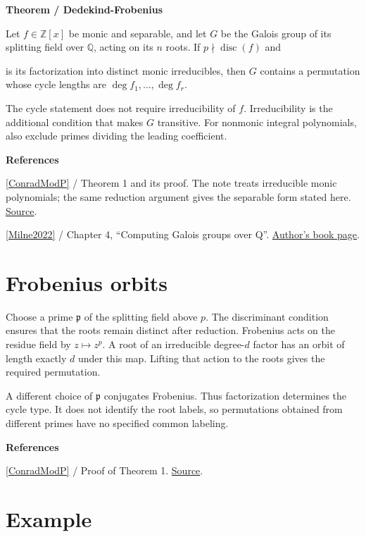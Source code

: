 \documentclass[11pt,a4paper,oneside,openany]{book}
\newcommand{\atlasdisplay}[1]{\par\begingroup\centering\vspace{3pt}\noindent\adjustbox{max width=\linewidth}{\(\displaystyle #1\)}\par\vspace{5pt}\endgroup}
\newenvironment{sources}{\par\smallskip\begingroup\footnotesize\color{atlasgray}\leftskip=10pt\setlength{\parskip}{2pt}}{\par\endgroup\smallskip}
\begin{document}
\begin{atlasblock}[standard]
\textbf{\sffamily Theorem  /  Dedekind-Frobenius}\par\smallskip
\color{black} Let \(f\in\mathbb Z[x]\) be monic and separable, and let \(G\) be the Galois group of its splitting field over \(\mathbb Q\), acting on its \(n\) roots. If \(p\nmid\operatorname{disc}(f)\) and\par

\atlasdisplay{\bar f=f_1\cdots f_r\quad\text{in }\mathbb F_p[x]}
\color{black} is its factorization into distinct monic irreducibles, then \(G\) contains a permutation whose cycle lengths are \(\deg f_1,\ldots,\deg f_r\).\par
\end{atlasblock}\color{black}
\color{black} The cycle statement does not require irreducibility of \(f\). Irreducibility is the additional condition that makes \(G\) transitive. For nonmonic integral polynomials, also exclude primes dividing the leading coefficient.\par
\begin{sources}
\textbf{References}\par\smallskip
\noindent\hyperlink{ref:ConradModP}{[ConradModP]} / Theorem 1 and its proof. The note treats irreducible monic polynomials; the same reduction argument gives the separable form stated here. \href{https://kconrad.math.uconn.edu/blurbs/gradnumthy/galois-Q-factor-mod-p.pdf}{Source}.\par
\noindent\hyperlink{ref:Milne2022}{[Milne2022]} / Chapter 4, ``Computing Galois groups over Q''.  \href{https://www.jmilne.org/math/Books/index.html}{Author's book page}.\par
\end{sources}\color{black}
\section{Frobenius orbits}
\color{black} Choose a prime \(\mathfrak p\) of the splitting field above \(p\). The discriminant condition ensures that the roots remain distinct after reduction. Frobenius acts on the residue field by \(z\mapsto z^p\). A root of an irreducible degree-\(d\) factor has an orbit of length exactly \(d\) under this map. Lifting that action to the roots gives the required permutation.\par
\color{black} A different choice of \(\mathfrak p\) conjugates Frobenius. Thus factorization determines the cycle type. It does not identify the root labels, so permutations obtained from different primes have no specified common labeling.\par
\begin{sources}
\textbf{References}\par\smallskip
\noindent\hyperlink{ref:ConradModP}{[ConradModP]} / Proof of Theorem 1.  \href{https://kconrad.math.uconn.edu/blurbs/gradnumthy/galois-Q-factor-mod-p.pdf}{Source}.\par
\end{sources}\color{black}
\section{Example}
\end{document}
